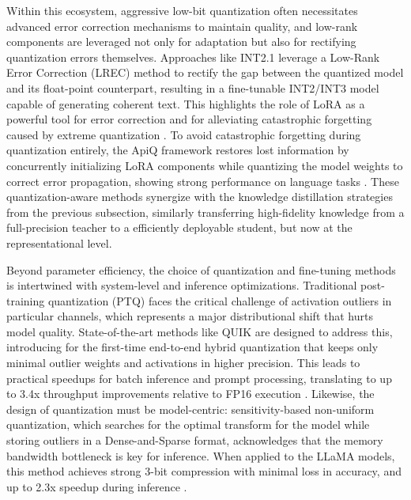 \documentclass[11pt]{article}
\begin{document}
Within this ecosystem, aggressive low-bit quantization often necessitates advanced error correction mechanisms to maintain quality, and low-rank components are leveraged not only for adaptation but also for rectifying quantization errors themselves. Approaches like INT2.1 leverage a Low-Rank Error Correction (LREC) method to rectify the gap between the quantized model and its float-point counterpart, resulting in a fine-tunable INT2/INT3 model capable of generating coherent text. This highlights the role of LoRA as a powerful tool for error correction and for alleviating catastrophic forgetting caused by extreme quantization \cite{ref242}. To avoid catastrophic forgetting during quantization entirely, the ApiQ framework restores lost information by concurrently initializing LoRA components while quantizing the model weights to correct error propagation, showing strong performance on language tasks \cite{ref243}. These quantization-aware methods synergize with the knowledge distillation strategies from the previous subsection, similarly transferring high-fidelity knowledge from a full-precision teacher to a efficiently deployable student, but now at the representational level.

Beyond parameter efficiency, the choice of quantization and fine-tuning methods is intertwined with system-level and inference optimizations. Traditional post-training quantization (PTQ) faces the critical challenge of activation outliers in particular channels, which represents a major distributional shift that hurts model quality. State-of-the-art methods like QUIK are designed to address this, introducing for the first-time end-to-end hybrid quantization that keeps only minimal outlier weights and activations in higher precision. This leads to practical speedups for batch inference and prompt processing, translating to up to 3.4x throughput improvements relative to FP16 execution \cite{ref244}. Likewise, the design of quantization must be model-centric: sensitivity-based non-uniform quantization, which searches for the optimal transform for the model while storing outliers in a Dense-and-Sparse format, acknowledges that the memory bandwidth bottleneck is key for inference. When applied to the LLaMA models, this method achieves strong 3-bit compression with minimal loss in accuracy, and up to 2.3x speedup during inference \cite{ref245}.
\end{document}
